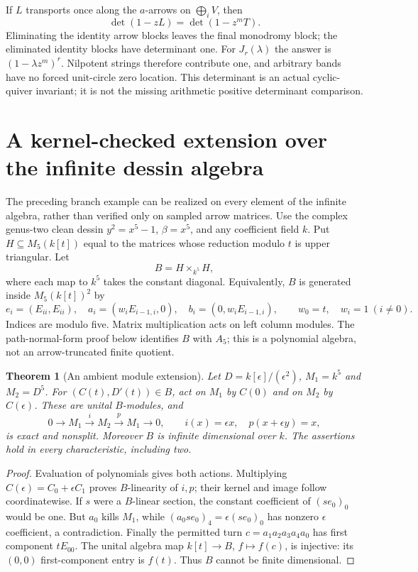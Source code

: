 \documentclass[11pt]{article}
\newtheorem{theorem}{Theorem}[section]
\theoremstyle{definition}\newtheorem{definition}[theorem]{Definition}
\theoremstyle{remark}\newtheorem{remark}[theorem]{Remark}
\begin{document}
If $L$ transports once along the $a$-arrows on $\bigoplus_iV$, then
\begin{equation}\label{rel:det}
 \det(1-zL)=\det(1-z^mT).
\end{equation}
Eliminating the identity arrow blocks leaves the final monodromy block;
the eliminated identity blocks have determinant one. For $J_r(\lambda)$
the answer is $(1-\lambda z^m)^r$. Nilpotent strings therefore contribute
one, and arbitrary bands have no forced unit-circle zero location. This
determinant is an actual cyclic-quiver invariant; it is not the missing
arithmetic positive determinant comparison.

\section{A kernel-checked extension over the infinite dessin algebra}
\label{bre:core}
The preceding branch example can be realized on every element of the
infinite algebra, rather than verified only on sampled arrow matrices.
Use the complex genus-two clean dessin $y^2=x^5-1$, $\beta=x^5$, and any
coefficient field $k$. Put $H\subseteq M_5(k[t])$ equal to the matrices
whose reduction modulo $t$ is upper triangular. Let
\[
 B=H\mathbin{\times}_{k^5}H,
\]
where each map to $k^5$ takes the constant diagonal. Equivalently, $B$ is
generated inside $M_5(k[t])^2$ by
\[
 e_i=(E_{ii},E_{ii}),\quad
 a_i=(w_iE_{i-1,i},0),\quad b_i=(0,w_iE_{i-1,i}),
 \qquad w_0=t,\quad w_i=1\ (i\ne0).
\]
Indices are modulo five. Matrix multiplication acts on left column
modules. The path-normal-form proof below identifies $B$ with $A_5$;
this is a polynomial algebra, not an arrow-truncated finite quotient.

\begin{theorem}[An ambient module extension]\label{bre:extension}
Let $D=k[\epsilon]/(\epsilon^2)$, $M_1=k^5$ and $M_2=D^5$.
For $(C(t),D'(t))\in B$, act on $M_1$ by $C(0)$ and on $M_2$ by
$C(\epsilon)$. These are unital $B$-modules, and
\[
 0\longrightarrow M_1\xrightarrow{\ i\ }M_2
 \xrightarrow{\ p\ }M_1\longrightarrow0,
 \qquad i(x)=\epsilon x,\quad p(x+\epsilon y)=x,
\]
is exact and nonsplit. Moreover $B$ is infinite dimensional over $k$.
The assertions hold in every characteristic, including two.
\end{theorem}
\begin{proof}
Evaluation of polynomials gives both actions. Multiplying
$C(\epsilon)=C_0+\epsilon C_1$ proves $B$-linearity of $i,p$;
their kernel and image follow coordinatewise. If $s$ were a $B$-linear
section, the constant coefficient of $(s e_0)_0$ would be one. But $a_0$ kills
$M_1$, while $(a_0s e_0)_4=\epsilon(s e_0)_0$ has nonzero
$\epsilon$ coefficient, a contradiction. Finally the permitted turn
$c=a_1a_2a_3a_4a_0$ has first component $tE_{00}$.
The unital algebra map $k[t]\to B$, $f\mapsto f(c)$, is injective:
its $(0,0)$ first-component entry is $f(t)$. Thus $B$ cannot be
finite dimensional.
\end{proof}
\end{document}

